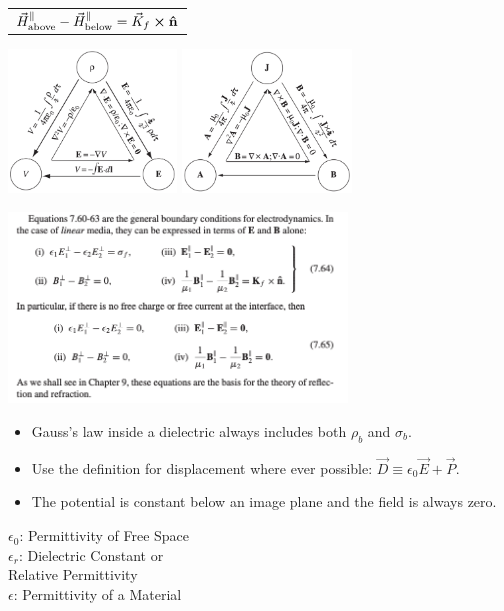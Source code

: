 \documentclass{article}
\newcommand{\formbox}[2]{\begin{center} \begin{tcolorbox}[title = #1, boxrule=2pt,arc=3.4pt,boxsep=0mm] #2\end{tcolorbox}\end{center}}
\begin{document}
\begin{multicols*}{2}
{{\begin{tabular}{ l }
            $\vec{H}_\text{above}^\parallel - \vec{H}_\text{below}^\parallel = \vec{K}_f \cross \vu{n}$
        \end{tabular}}
    }
    \formbox{Triangles}{
        \begin{center}
            \includegraphics[height=3.8cm]{em-triangle.png}
            \includegraphics[height=3.8cm]{magnetic-triangle.png}
        \end{center}
    }
    \formbox{More Boundary Conditions}{
        \begin{center}
            \includegraphics[width=9cm]{boundary-conditions.png}
        \end{center}
    }
    \formbox{Takeaways from Practice}{
        \begin{itemize}
            \item Gauss's law inside a dielectric always includes both $\rho_b$ and $\sigma_b$.
            \item Use the definition for displacement where ever possible: $\vec{D} \equiv \epsilon_0 \vec{E} + \vec{P}$.
            \item The potential is constant below an image plane and the field is always zero. 
        \end{itemize}
    }
    \formbox{Names of Stuff}{
        $\epsilon_0$: Permittivity of Free Space\\
        $\epsilon_r$: Dielectric Constant or \\
        \hspace{0.5cm}Relative Permittivity\\
        $\epsilon$: Permittivity of a Material
    }
    \vfill\null
\end{multicols*}
\end{document}
